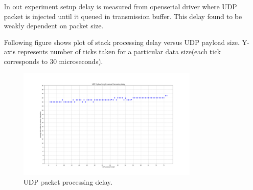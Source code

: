 In out experiment setup delay is measured from openserial driver where UDP packet is injected until it queued in transmission buffer. This delay found to be weakly dependent on packet size.

Following figure shows plot of stack processing delay versus UDP payload size. Y-axis represents number of ticks taken for a particular data size(each tick corresponds to 30 microseconds).

\begin{figure}[H]
	\includegraphics[width=0.8\textwidth,center]{UDP_Packet_processing_delay.png}
	\caption{UDP packet processing delay.}
	\label{fig:write_trans}
\end{figure}
